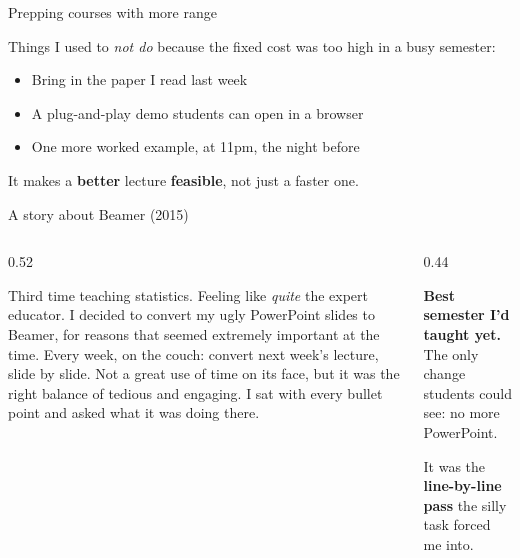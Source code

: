 \documentclass[aspectratio=169, 10pt]{beamer}
\begin{document}
\begin{frame}{Prepping courses with more range}
\vskip4pt
\begin{tcolorbox}[keybox, title={\faLightbulb\quad More range}]
\small
Things I used to \emph{not do} because the fixed cost was too high in a busy semester:
\vskip4pt
\begin{itemize}\setlength{\itemsep}{3pt}
  \item Bring in the paper I read last week
  \item A plug-and-play demo students can open in a browser
  \item One more worked example, at 11pm, the night before
\end{itemize}
\end{tcolorbox}
\vskip8pt
\begin{tcolorbox}[accentbox, top=3pt, bottom=3pt]
\small It makes a \textbf{better} lecture \textbf{feasible}, not just a faster one. 
\end{tcolorbox}
\end{frame}

\begin{frame}{A story about Beamer (2015)}
\vskip2pt
\begin{columns}[T]
\begin{column}{0.52\textwidth}
\begin{tcolorbox}[quotebox, top=4pt, bottom=4pt]
\small
Third time teaching statistics. Feeling like \emph{quite} the expert educator. I decided to convert my ugly PowerPoint slides to Beamer, for reasons that seemed extremely important at the time.
\vskip4pt
Every week, on the couch: convert next week's lecture, slide by slide. 
\vskip4pt
Not a great use of time on its face, but it was the right balance of tedious and engaging. I sat with {every bullet point} and asked what it was doing there.
\end{tcolorbox}
\end{column}
\begin{column}{0.44\textwidth}
\begin{tcolorbox}[accentbox, top=4pt, bottom=4pt]
\small
\textbf{Best semester I'd taught yet.}
\vskip3pt
The only change students could see: no more PowerPoint.
\end{tcolorbox}
\vskip6pt
\begin{tcolorbox}[keybox, title={\faSearch\quad It wasn't about the slides}]
\small It was the \textbf{line-by-line pass} the silly task forced me into.
\end{tcolorbox}
\end{column}
\end{columns}
\end{frame}
\end{document}
